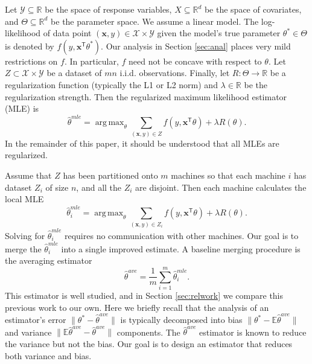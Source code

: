 \documentclass[twoside]{article}
\DeclareMathOperator*{\argmax}{arg\,max}
\newcommand{\Y}{\mathcal{Y}}
\newcommand{\X}{\mathcal{X}}
\newcommand{\E}{\mathbb{E}}
\newcommand{\x}{\mathbf{x}}
\newcommand{\w}{\theta}
\newcommand{\wave}{\hat\w^{ave}}
\newcommand{\wmle}{\hat\w^{mle}}
\newcommand{\wstar}{{\w^{*}}}
\newcommand{\trans}[1]{\ensuremath{{#1}^{\mathsf{T}}}}
\newcommand{\ltwo}[1]{{\lVert {#1} \rVert}}
\begin{document}
Let $\Y\subseteq\mathbb{R}$ be the space of response variables,
$X\subseteq\mathbb{R}^d$ be the space of covariates,
and $\Theta\subseteq\mathbb{R}^d$ be the parameter space.
We assume a linear model.
The log-likelihood of data point $(\x,y)\in\X\times\Y$ given the model's true parameter $\wstar\in\Theta$ is denoted by $f(y,\trans\x\wstar)$.
Our analysis in Section \ref{sec:anal} places very mild restrictions on $f$.
In particular, $f$ need not be concave with respect to $\w$.
Let $Z\subset\X\times\Y$ be a dataset of $mn$ i.i.d. observations.
Finally, let $R : \Theta \to \mathbb{R}$ be a regularization function (typically the L1 or L2 norm)
and $\lambda\in\mathbb{R}$ be the regularization strength.
Then the regularized maximum likelihood estimator (MLE) is
\begin{equation}
\wmle=\argmax_\w \sum_{(\x,y)\in Z} f(y,\trans\x\w)
+ \lambda R(\theta)
.
\end{equation}
In the remainder of this paper, it should be understood that all MLEs are regularized.

Assume that $Z$ has been partitioned onto $m$ machines so that each machine $i$ has dataset $Z_i$ of size $n$, and all the $Z_i$ are disjoint.
Then each machine calculates the local MLE
\begin{equation}
\wmle_i = \argmax_\w \sum_{(\x,y) \in Z_i} f(y,\trans\x\w)
+ \lambda R(\theta)
.
\end{equation}
Solving for $\wmle_i$ requires no communication with other machines.
Our goal is to merge the $\wmle_i$ into a single improved estimate.
A baseline merging procedure is the averaging estimator
\begin{equation}
\wave = \frac{1}{m}\sum_{i=1}^m \wmle_i
.
\end{equation}
This estimator is well studied, and in Section \ref{sec:relwork} we compare this previous work to our own.
Here we briefly recall that the analysis of an estimator's error $\ltwo{\wstar-\wave}$ is typically decomposed into bias $\ltwo{\wstar - \E\wave}$ and variance $\ltwo{\E\wave-\wave}$ components.
The $\wave$ estimator is known to reduce the variance but not the bias.
Our goal is to design an estimator that reduces both variance and bias.
\end{document}
